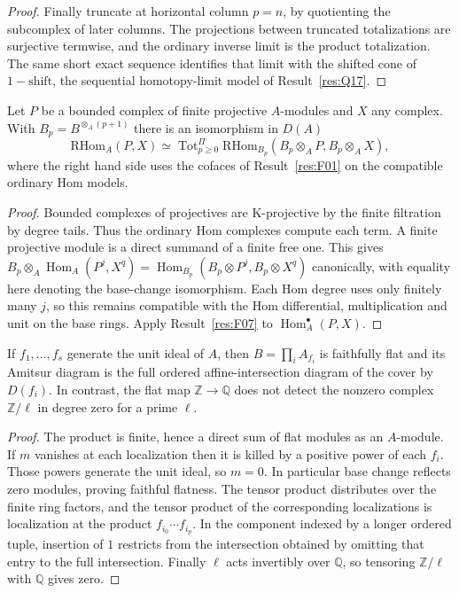 \begin{proof}
Finally truncate at horizontal column \(p=n\), by quotienting the
subcomplex of later columns. The projections between truncated
totalizations are surjective termwise, and the ordinary inverse
limit is the product totalization. The same short exact sequence
identifies that limit with the shifted cone of \(1-\mathrm{shift}\),
the sequential homotopy-limit model of Result~\ref{res:Q17}.
\end{proof}

\begin{corollary}\label{res:F08}
Let \(P\) be a bounded complex of finite projective \(A\)-modules
and \(X\) any complex. With \(B_p=B^{\otimes_A(p+1)}\) there is an
isomorphism in \(D(A)\)
\[
 \mathrm{RHom}_A(P,X)\simeq
 \operatorname{Tot}^{\Pi}_{p\geq0}
 \mathrm{RHom}_{B_p}(B_p\otimes_A P,B_p\otimes_A X),
\]
where the right hand side uses the cofaces of Result~\ref{res:F01}
on the compatible ordinary Hom models.
\end{corollary}
\begin{proof}
Bounded complexes of projectives are K-projective by the finite
filtration by degree tails. Thus the ordinary Hom complexes
compute each term. A finite projective module is a direct summand
of a finite free one. This gives
\(B_p\otimes_A\operatorname{Hom}_A(P^j,X^q)
=\operatorname{Hom}_{B_p}(B_p\otimes P^j,B_p\otimes X^q)\)
canonically, with equality here denoting the base-change isomorphism.
Each Hom degree uses only finitely many \(j\), so this remains
compatible with the Hom differential, multiplication and unit
on the base rings. Apply Result~\ref{res:F07} to
\(\operatorname{Hom}_A^\bullet(P,X)\).
\end{proof}

\begin{example}\label{res:F09}
If \(f_1,\ldots,f_s\) generate the unit ideal of \(A\), then
\(B=\prod_i A_{f_i}\) is faithfully flat and its Amitsur diagram
is the full ordered affine-intersection diagram of the cover by
\(D(f_i)\). In contrast, the flat map \(\mathbb Z\to\mathbb Q\)
does not detect the nonzero complex \(\mathbb Z/\ell\) in degree
zero for a prime \(\ell\).
\end{example}
\begin{proof}
The product is finite, hence a direct sum of flat modules as an
\(A\)-module. If \(m\) vanishes at each localization then it is
killed by a positive power of each \(f_i\). Those powers generate
the unit ideal, so \(m=0\). In particular base change reflects
zero modules, proving faithful flatness. The tensor product
distributes over the finite ring factors, and the tensor product
of the corresponding localizations is localization at the
product \(f_{i_0}\cdots f_{i_p}\). In the component indexed by a
longer ordered tuple, insertion of \(1\) restricts from the
intersection obtained by omitting that entry to the full intersection.
Finally \(\ell\) acts invertibly over \(\mathbb Q\), so tensoring
\(\mathbb Z/\ell\) with \(\mathbb Q\) gives zero.
\end{proof}


